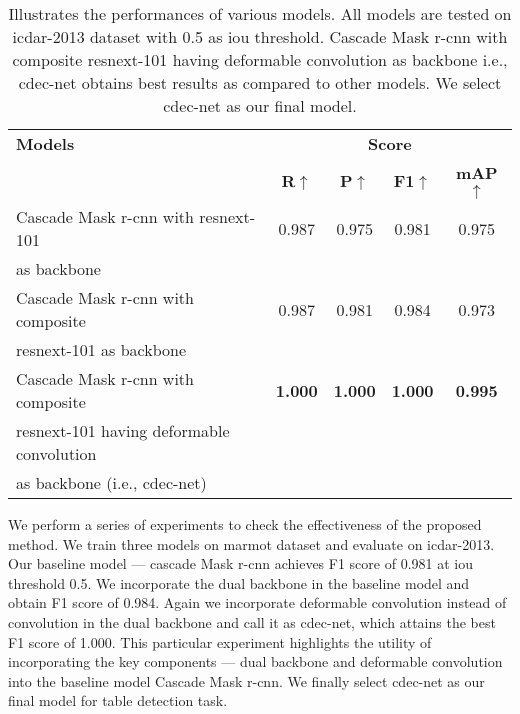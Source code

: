 \documentclass[a4paper,conference]{IEEEtran}
\begin{document}
\begin{table}[ht!]
\addtolength{\tabcolsep}{-4.0pt}
\begin{center}
\begin{tabular}{|l|c c c c|} \hline
\textbf{Models} &\multicolumn{4}{|c|}{\textbf{Score}} \\ \cline{2-5}
 &\textbf{R}$\uparrow$ &\textbf{P}$\uparrow$ &\textbf{F1}$\uparrow$ &\textbf{mAP}$\uparrow$ \\ \hline 
Cascade Mask {\sc r-cnn} with {\sc r}es{\sc n}e{\sc x}t-101 &0.987 &0.975 &0.981 &0.975 \\
 as backbone  &    &    &   & \\ \hline
Cascade Mask {\sc r-cnn} with composite &0.987 &0.981 &0.984 &0.973 \\
{\sc r}es{\sc n}e{\sc x}t-101 as backbone &   &  &   & \\ \hline
Cascade Mask {\sc r-cnn} with composite &\textbf{1.000} &\textbf{1.000} &\textbf{1.000} &\textbf{0.995}\\ 
{\sc r}es{\sc n}e{\sc x}t-101 having deformable convolution &  & &  & \\ 
as backbone (i.e., {\sc cd}e{\sc c-n}et) &  & &  & \\ \hline
\end{tabular}
\end{center}
\caption{Illustrates the performances of various models. All models are tested on {\sc icdar-2013} dataset with 0.5 as {\sc i}o{\sc u} threshold. Cascade Mask {\sc r-cnn} with composite {\sc r}es{\sc n}e{\sc x}t-101 having deformable convolution as backbone i.e., {\sc cd}e{\sc c-n}et obtains best results as compared to other models. We select {\sc cd}e{\sc c-n}et as our final model. \label{ablation_study_table}}
\end{table}
 
We perform a series of experiments to check the effectiveness of the proposed method. We train three models on {\sc m}armot dataset and evaluate on {\sc icdar}-2013. Our baseline model --- cascade Mask {\sc r-cnn} achieves F1 score of 0.981 at {\sc i}o{\sc u} threshold 0.5. We incorporate the dual backbone in the baseline model and obtain F1 score of 0.984. Again we incorporate deformable convolution instead of convolution in the dual backbone and call it as {\sc cd}e{\sc c-n}et, which attains the best F1 score of 1.000. This particular experiment highlights the utility of incorporating the key components --- dual backbone and deformable convolution into the baseline model Cascade Mask {\sc r-cnn}. We finally select {\sc cd}e{\sc c-n}et as our final model for table detection task.
\end{document}
